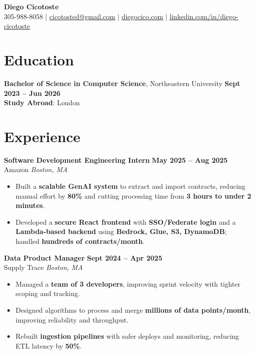 \documentclass{resume}
\begin{document}
\begin{center}
    \textbf{\Huge Diego Cicotoste} \\[1pt]
    \small
    305-988-8058 $|$
    \href{mailto:cicotosted@gmail.com}{\underline{cicotosted@gmail.com}} $|$
    \href{https://www.diegocico.com}{\underline{diegocico.com}} $|$
    \href{https://linkedin.com/in/diego-cicotoste}{\underline{linkedin.com/in/diego-cicotoste}}
\end{center}

\section{Education}
\textbf{Bachelor of Science in Computer Science}, Northeastern University
\hfill \textbf{Sept 2023 – Jun 2026}\\
\textbf{Study Abroad}: London

\section{Experience}

\textbf{Software Development Engineering Intern} \hfill \textbf{May 2025 – Aug 2025}\\
Amazon \hfill \textit{Boston, MA}
\begin{itemize}
    \item Built a \textbf{scalable GenAI system} to extract and import contracts, reducing manual effort by \textbf{80\%} and cutting processing time from \textbf{3 hours to under 2 minutes}.
    \item Developed a \textbf{secure React frontend} with \textbf{SSO/Federate login} and a \textbf{Lambda-based backend} using \textbf{Bedrock, Glue, S3, DynamoDB}; handled \textbf{hundreds of contracts/month}.
\end{itemize}

\textbf{Data Product Manager} \hfill \textbf{Sept 2024 – Apr 2025}\\
Supply Trace \hfill \textit{Boston, MA}
\begin{itemize}
    \item Managed a \textbf{team of 3 developers}, improving sprint velocity with tighter scoping and tracking.
    \item Designed algorithms to process and merge \textbf{millions of data points/month}, improving reliability and throughput.
    \item Rebuilt \textbf{ingestion pipelines} with safer deploys and monitoring, reducing ETL latency by \textbf{50\%}.
\end{itemize}
\end{document}
